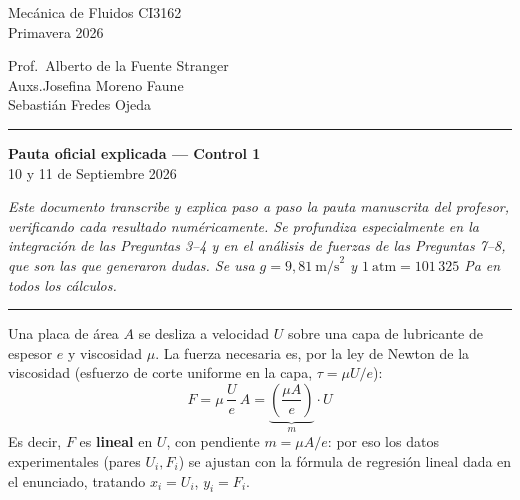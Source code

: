 \documentclass[11pt]{article}
\begin{document}
\shorthandoff{<>}

\noindent
\begin{minipage}[t]{0.45\textwidth}
\raggedright
Mec\'anica de Fluidos CI3162\\
Primavera 2026
\end{minipage}%
\hfill
\begin{minipage}[t]{0.45\textwidth}
\raggedleft
Prof.\ Alberto de la Fuente Stranger\\
Auxs.\hspace{0.6cm}Josefina Moreno Faune\\
Sebasti\'an Fredes Ojeda
\end{minipage}

\vspace{3pt}
\hrule
\vspace{-5pt}

\begin{center}
{\Huge\bfseries Pauta oficial explicada --- Control 1}\\[6pt]
10 y 11 de Septiembre 2026
\end{center}

\vspace{10pt}
\noindent\textit{Este documento transcribe y explica paso a paso la pauta manuscrita del
profesor, verificando cada resultado num\'ericamente. Se profundiza especialmente en la
integraci\'on de las Preguntas 3--4 y en el an\'alisis de fuerzas de las Preguntas 7--8,
que son las que generaron dudas. Se usa $g=9{,}81\ \text{m/s}^2$ y $1\ \text{atm}=101\,325$
Pa en todos los c\'alculos.}
\vspace{4pt}
\hrule

\newpage
{}

\noindent Una placa de \'area $A$ se desliza a velocidad $U$ sobre una capa de lubricante
de espesor $e$ y viscosidad $\mu$. La fuerza necesaria es, por la ley de Newton de la
viscosidad (esfuerzo de corte uniforme en la capa, $\tau=\mu U/e$):
\begin{equation}
F=\mu\,\frac{U}{e}\,A=\underbrace{\left(\frac{\mu A}{e}\right)}_{m}\cdot U
\end{equation}
Es decir, $F$ es \textbf{lineal} en $U$, con pendiente $m=\mu A/e$: por eso los datos
experimentales (pares $U_i,F_i$) se ajustan con la f\'ormula de regresi\'on lineal dada
en el enunciado, tratando $x_i=U_i$, $y_i=F_i$.
\end{document}
